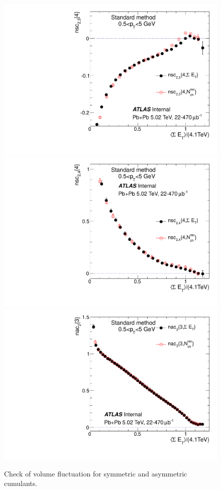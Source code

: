 \begin{figure}[H]
\centering
\includegraphics[width=.32\linewidth]{figs/sec_paper/comp_nsc_t0_har2_pt0.pdf}
\includegraphics[width=.32\linewidth]{figs/sec_paper/comp_nsc_t0_har3_pt0.pdf}
\includegraphics[width=.32\linewidth]{figs/sec_paper/comp_nac_t0_har2_pt0.pdf}
\caption{Check of volume fluctuation for symmetric and asymmetric cumulants.}
\label{fig:paper_vf_sc}
\end{figure}
